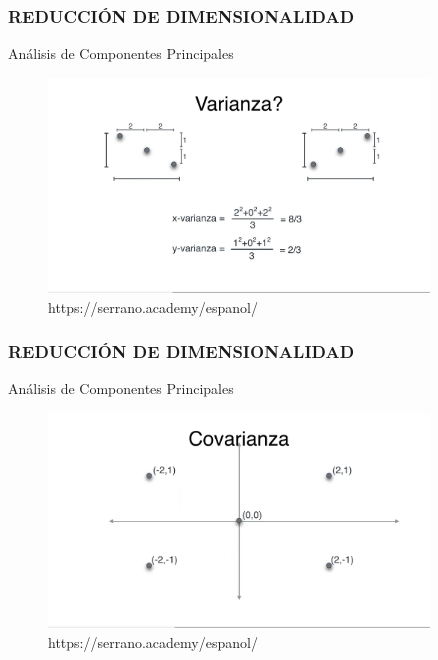 \documentclass{beamer}
\begin{document}
\begin{frame}
	\frametitle{REDUCCIÓN DE DIMENSIONALIDAD}
	\begin{block}{Análisis de Componentes Principales}	
		\begin{figure}
			\includegraphics[width=0.9\textwidth]{PCA/IMG_3551.jpg}
			\caption{https://serrano.academy/espanol/}
		\end{figure}
	\end{block}
\end{frame}

\begin{frame}
	\frametitle{REDUCCIÓN DE DIMENSIONALIDAD}
	\begin{block}{Análisis de Componentes Principales}	
		\begin{figure}
			\includegraphics[width=0.9\textwidth]{PCA/IMG_3552.jpg}
			\caption{https://serrano.academy/espanol/}
		\end{figure}
	\end{block}
\end{frame}
\end{document}
